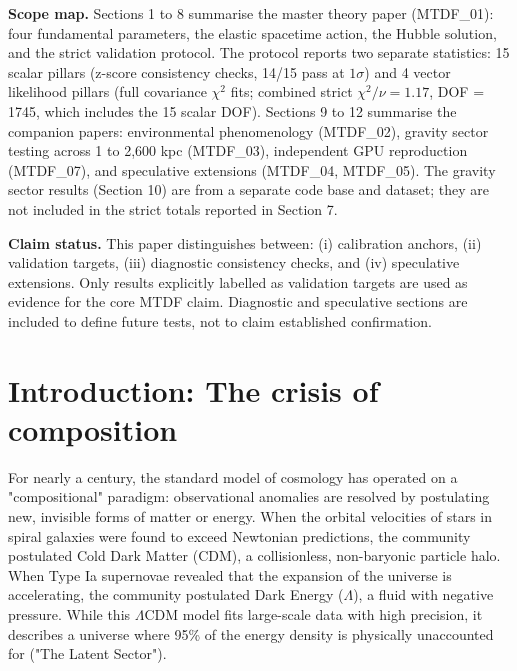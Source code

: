 \documentclass[11pt,a4paper]{article}
\begin{document}
\begin{mdframed}[linecolor=accent,linewidth=0.5pt,backgroundcolor=callout-bg,leftline=true,rightline=true,topline=true,bottomline=true,innerleftmargin=8pt,innerrightmargin=8pt,innertopmargin=6pt,innerbottommargin=6pt]
\textbf{Scope map.} Sections 1 to 8 summarise the master theory paper (MTDF\_\allowbreak{}01): four fundamental parameters, the elastic spacetime action, the Hubble solution, and the strict validation protocol. The protocol reports two separate statistics: 15 scalar pillars (z-score consistency checks, 14/\allowbreak{}15 pass at $1\sigma$) and 4 vector likelihood pillars (full covariance $\chi^2$ fits; combined strict $\chi^2/\nu = 1.17$, DOF = 1745, which includes the 15 scalar DOF). Sections 9 to 12 summarise the companion papers: environmental phenomenology (MTDF\_\allowbreak{}02), gravity sector testing across 1 to 2,600 kpc (MTDF\_\allowbreak{}03), independent GPU reproduction (MTDF\_\allowbreak{}07), and speculative extensions (MTDF\_\allowbreak{}04, MTDF\_\allowbreak{}05). The gravity sector results (Section 10) are from a separate code base and dataset; they are not included in the strict totals reported in Section 7.
\end{mdframed}

\tableofcontents

\begin{mdframed}[linecolor=accent,linewidth=0.5pt,backgroundcolor=callout-bg,leftline=true,rightline=true,topline=true,bottomline=true,innerleftmargin=8pt,innerrightmargin=8pt,innertopmargin=6pt,innerbottommargin=6pt]
\textbf{Claim status.}
This paper distinguishes between:
(i) calibration anchors,
(ii) validation targets,
(iii) diagnostic consistency checks, and
(iv) speculative extensions.
Only results explicitly labelled as validation targets are used as evidence for the core MTDF claim. Diagnostic and speculative sections are included to define future tests, not to claim established confirmation.
\end{mdframed}

\section{Introduction: The crisis of composition}
\label{sec:sec1}
For nearly a century, the standard model of cosmology has operated on a "compositional" paradigm: observational anomalies are resolved by postulating new, invisible forms of matter or energy. When the orbital velocities of stars in spiral galaxies were found to exceed Newtonian predictions, the community postulated Cold Dark Matter (CDM), a collisionless, non-baryonic particle halo. When Type Ia supernovae revealed that the expansion of the universe is accelerating, the community postulated Dark Energy ($\Lambda$), a fluid with negative pressure. While this $\Lambda$CDM model fits large-scale data with high precision, it describes a universe where 95\% of the energy density is physically unaccounted for ("The Latent Sector").
\end{document}
